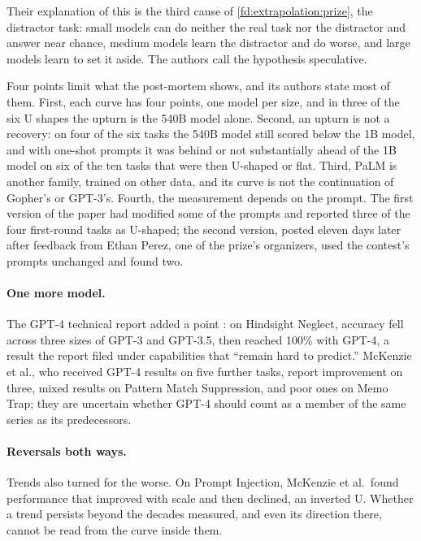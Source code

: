 \begin{refsection}
Their explanation of this  is the third cause of \cref{fd:extrapolation:prize}, the distractor task: small models can do neither the real task nor the distractor and answer near chance, medium models learn the distractor and do worse, and large models learn to set it aside. The authors call the hypothesis speculative.

Four points limit what the post-mortem shows, and its authors state most of them. First, each curve has four points, one model per size, and in three of the six U shapes the upturn is the 540B model alone. Second, an upturn is not a recovery: on four of the six tasks the 540B model still scored below the 1B model, and with one-shot prompts it was behind or not substantially ahead of the 1B model on six of the ten tasks that were then U-shaped or flat. Third, PaLM is another family, trained on other data, and its curve is not the continuation of Gopher's or GPT-3's. Fourth, the measurement depends on the prompt. The first version of the paper had modified some of the prompts and reported three of the four first-round tasks as U-shaped; the second version, posted eleven days later after feedback from Ethan Perez, one of the prize's organizers, used the contest's prompts unchanged and found two.

\paragraph{One more model.} The GPT-4 technical report added a point \parencite{OpenAI2023}: on Hindsight Neglect, accuracy fell across three sizes of GPT-3 and GPT-3.5, then reached 100\% with GPT-4, a result the report filed under capabilities that ``remain hard to predict.'' McKenzie et al., who received GPT-4 results on five further tasks, report improvement on three, mixed results on Pattern Match Suppression, and poor ones on Memo Trap; they are uncertain whether GPT-4 should count as a member of the same series as its predecessors.

\paragraph{Reversals both ways.} Trends also turned for the worse. On Prompt Injection, McKenzie et al.\ found performance that improved with scale and then declined, an inverted U. Whether a trend persists beyond the decades measured, and even its direction there, cannot be read from the curve inside them.


\end{refsection}
